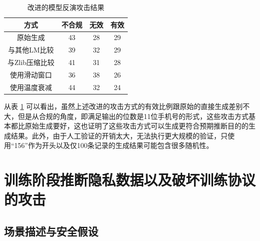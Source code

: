 \begin{table}[]
	\centering
	\caption{改进的模型反演攻击结果}
	\begin{tabular}{|c|c|c|c|}
		\hline
		方式&不合规&无效&有效   \\ \hline
		原始生成&43&28&29    \\ \hline
		与其他LM比较&39&32&29    \\ \hline
		与Zlib压缩比较&41&31&28    \\ \hline
		使用滑动窗口&36&38&26    \\ \hline
		使用温度衰减&44&32&24    \\ \hline
	\end{tabular}
	\label{Remaster_Attack_Method_with_Num_Success}
\end{table}


从表 \ref{Remaster_Attack_Method_with_Num_Success} 可以看出，虽然上述改进的攻击方式的有效比例跟原始的直接生成差别不大，但是从合规的角度，即满足输出的位数是11位手机号的形式，这些攻击方式基本都比原始生成要好，这也证明了这些攻击方式可以生成更符合预期推断目的的生成结果。此外，由于人工验证的开销太大，无法执行更大规模的验证，只使用“156”作为开头以及仅100条记录的生成结果可能包含很多随机性。


\section{训练阶段推断隐私数据以及破坏训练协议的攻击}



\subsection{场景描述与安全假设}


